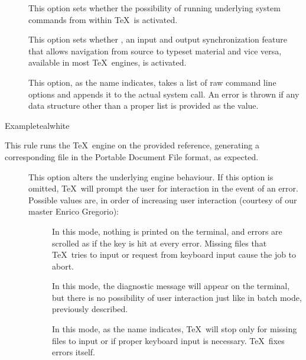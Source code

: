 \begin{description}
\begin{description}
\item[] This option sets whether the possibility of running underlying system commands from within \TeX\ is activated.

\item[] This option sets whether , an input and output synchronization feature that allows navigation from source to typeset material and vice versa, available in most \TeX\ engines, is activated.

\item[] This option, as the name indicates, takes a list of raw command line options and appends it to the actual system call. An error is thrown if any data structure other than a proper list is provided as the value.
\end{description}

\begin{codebox}{Example}{teal}{\icnote}{white}
\end{codebox}

\item[\rulebox{xetex}]
This rule runs the  \TeX\ engine on the provided  reference, generating a corresponding file in the Portable Document File format, as expected.

\begin{description}
\item[] This option alters the underlying engine behaviour. If this option is omitted, \TeX\ will prompt the user for interaction in the event of an error. Possible values are, in order of increasing user interaction (courtesy of our master Enrico Gregorio):

\begin{description}
\item[] In this mode, nothing is printed on the terminal, and errors are scrolled as if the  key is hit at every error. Missing files that \TeX\ tries to input or request from keyboard input cause the job to abort.

\item[] In this mode, the diagnostic message will appear on the terminal, but there is no possibility of user interaction just like in batch mode, previously described.

\item[] In this mode, as the name indicates, \TeX\ will stop only for missing files to input or if proper keyboard input is necessary. \TeX\ fixes errors itself.


\end{description}
\end{description}
\end{description}
